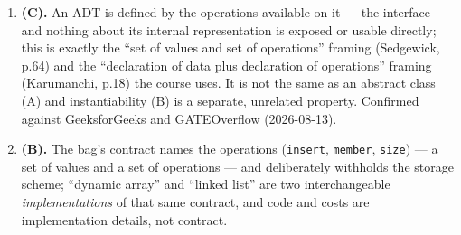 \documentclass[11pt]{article}
\begin{document}
\begin{enumerate}
\item[\textbf{Q14}] \textbf{(C).} An ADT is defined by the operations available on it --- the interface --- and nothing about its internal representation is exposed or usable directly; this is exactly the ``set of values and set of operations'' framing (Sedgewick, p.64) and the ``declaration of data plus declaration of operations'' framing (Karumanchi, p.18) the course uses. It is not the same as an abstract class (A) and instantiability (B) is a separate, unrelated property. Confirmed against GeeksforGeeks and GATEOverflow (2026-08-13).

\item[\textbf{Q15}] \textbf{(B).} The bag's contract names the operations (\texttt{insert}, \texttt{member}, \texttt{size}) --- a set of values and a set of operations --- and deliberately withholds the storage scheme; ``dynamic array'' and ``linked list'' are two interchangeable \emph{implementations} of that same contract, and code and costs are implementation details, not contract.
\end{enumerate}
\end{document}

